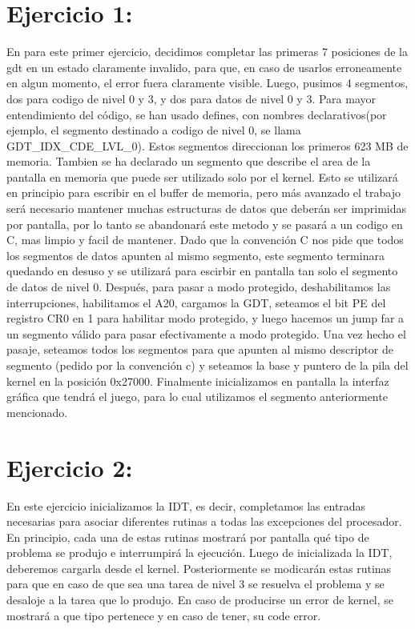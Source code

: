 \documentclass[a4paper]{article}
\begin{document}
\clearpage

\section{Ejercicio 1:}
En para este primer ejercicio, decidimos completar las primeras 7 posiciones de la gdt en un estado claramente invalido, para que, en caso de usarlos erroneamente en algun momento, el error fuera claramente visible. Luego, pusimos 4 segmentos, dos para codigo de nivel 0 y 3, y dos para datos de nivel 0 y 3. Para mayor entendimiento del código, se han usado defines, con nombres declarativos(por ejemplo, el segmento destinado a codigo de nivel 0, se llama GDT_IDX_CDE_LVL_0). Estos segmentos direccionan los primeros 623 MB de memoria. Tambien se ha declarado un segmento que describe el area de la pantalla en memoria que puede ser utilizado solo por el kernel. Esto se utilizará en principio para escribir en el buffer de memoria, pero más avanzado el trabajo será necesario mantener muchas estructuras de datos que deberán ser imprimidas por pantalla, por lo tanto se abandonará este metodo y se pasará a un codigo en C, mas limpio y facil de mantener. Dado que la convención C nos pide que todos los segmentos de datos apunten al mismo segmento, este segmento terminara quedando en desuso y se utilizará para escirbir en pantalla tan solo el segmento de datos de nivel 0. Después, para pasar a modo protegido, deshabilitamos las interrupciones, habilitamos el A20, cargamos la GDT, seteamos el bit PE del registro CR0 en 1 para habilitar modo protegido, y luego hacemos un jump far a un segmento válido para pasar efectivamente a modo protegido. Una vez hecho el pasaje, seteamos todos los segmentos para que apunten al mismo descriptor de segmento (pedido por la convención c) y seteamos la base y puntero de la pila del kernel en la posición 0x27000. Finalmente inicializamos en pantalla la interfaz gráfica que tendrá el juego, para lo cual utilizamos el segmento anteriormente mencionado.

%

\clearpage

\section{Ejercicio 2:} 
%

En este ejercicio inicializamos la IDT, es decir, completamos las entradas necesarias para asociar diferentes rutinas a todas las excepciones del procesador. En principio, cada una de estas rutinas mostrará por pantalla qué tipo de problema se produjo e interrumpirá la ejecución. Luego de inicializada la IDT, deberemos cargarla desde el kernel. Posteriormente se modicarán estas rutinas para que en caso de que sea una tarea de nivel 3 se resuelva el problema y se desaloje a la tarea que lo produjo.
En caso de producirse un error de kernel, se mostrará a que tipo pertenece y en caso de tener, su code error.
\end{document}
